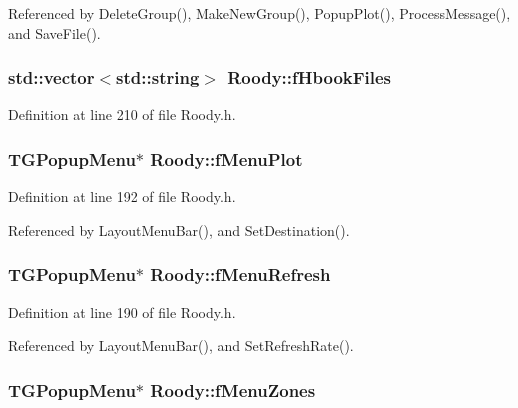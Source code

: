 Referenced by DeleteGroup(), MakeNewGroup(), PopupPlot(), ProcessMessage(), and SaveFile().

\subsubsection[{fHbookFiles}]{\setlength{\rightskip}{0pt plus 5cm}std::vector$<$std::string$>$ {\bf Roody::fHbookFiles}\hspace{0.3cm}{\ttfamily  [private]}}\label{classRoody_a60a66e11c2b5edc58bf31f89d859b021}


Definition at line 210 of file Roody.h.

\subsubsection[{fMenuPlot}]{\setlength{\rightskip}{0pt plus 5cm}TGPopupMenu$\ast$ {\bf Roody::fMenuPlot}\hspace{0.3cm}{\ttfamily  [private]}}\label{classRoody_aeb8acfcf28d286fb41a24cdb7062f993}


Definition at line 192 of file Roody.h.



Referenced by LayoutMenuBar(), and SetDestination().

\subsubsection[{fMenuRefresh}]{\setlength{\rightskip}{0pt plus 5cm}TGPopupMenu$\ast$ {\bf Roody::fMenuRefresh}\hspace{0.3cm}{\ttfamily  [private]}}\label{classRoody_a1d94b444813ea45ad4fc0eb2887c2372}


Definition at line 190 of file Roody.h.



Referenced by LayoutMenuBar(), and SetRefreshRate().

\subsubsection[{fMenuZones}]{\setlength{\rightskip}{0pt plus 5cm}TGPopupMenu$\ast$ {\bf Roody::fMenuZones}\hspace{0.3cm}{\ttfamily  [private]}}\label{classRoody_a937dc50c484d341aae57f37d35d9a599}



